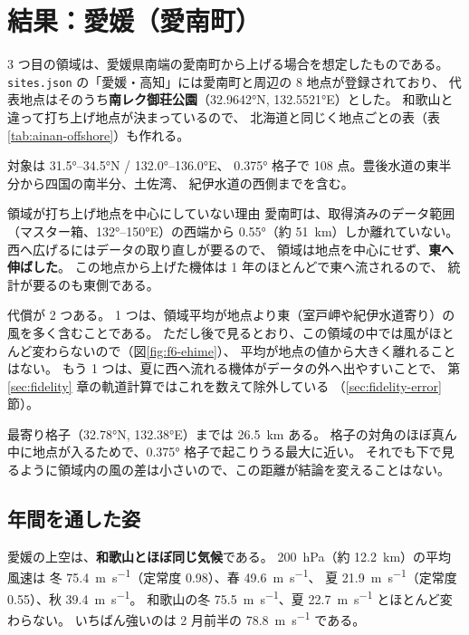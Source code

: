 \section{結果：愛媛（愛南町）}
\label{sec:ehime}

3 つ目の領域は、愛媛県南端の愛南町から上げる場合を想定したものである。
\texttt{sites.json} の「愛媛・高知」には愛南町と周辺の 8 地点が登録されており、
代表地点はそのうち\textbf{南レク御荘公園}（\ang{32.9642}N, \ang{132.5521}E）とした。
和歌山と違って打ち上げ地点が決まっているので、
北海道と同じく地点ごとの表（表\ref{tab:ainan-offshore}）も作れる。

対象は \ang{31.5}--\ang{34.5}N / \ang{132.0}--\ang{136.0}E、
\ang{0.375} 格子で 108 点。豊後水道の東半分から四国の南半分、土佐湾、
紀伊水道の西側までを含む。

\begin{whybox}{領域が打ち上げ地点を中心にしていない理由}
愛南町は、取得済みのデータ範囲（マスター箱、\ang{132}--\ang{150}E）の西端から
\ang{0.55}（約 \SI{51}{\kilo\metre}）しか離れていない。
西へ広げるにはデータの取り直しが要るので、
領域は地点を中心にせず、\textbf{東へ伸ばした}。
この地点から上げた機体は 1 年のほとんどで東へ流されるので、
統計が要るのも東側である。

代償が 2 つある。
1 つは、領域平均が地点より東（室戸岬や紀伊水道寄り）の風を多く含むことである。
ただし後で見るとおり、この領域の中では風がほとんど変わらないので（図\ref{fig:f6-ehime}）、
平均が地点の値から大きく離れることはない。
もう 1 つは、夏に西へ流れる機体がデータの外へ出やすいことで、
第 \ref{sec:fidelity} 章の軌道計算ではこれを数えて除外している
（\ref{sec:fidelity-error} 節）。
\end{whybox}

最寄り格子（\ang{32.78}N, \ang{132.38}E）までは \SI{26.5}{\kilo\metre} ある。
格子の対角のほぼ真ん中に地点が入るためで、\ang{0.375} 格子で起こりうる最大に近い。
それでも下で見るように領域内の風の差は小さいので、この距離が結論を変えることはない。

\subsection{年間を通した姿}





愛媛の上空は、\textbf{和歌山とほぼ同じ気候}である。
\SI{200}{\hecto\pascal}（約 \SI{12.2}{\kilo\metre}）の平均風速は
冬 \SI{75.4}{\metre\per\second}（定常度 0.98）、春 \SI{49.6}{\metre\per\second}、
夏 \SI{21.9}{\metre\per\second}（定常度 0.55）、秋 \SI{39.4}{\metre\per\second}。
和歌山の冬 \SI{75.5}{\metre\per\second}、夏 \SI{22.7}{\metre\per\second} とほとんど変わらない。
いちばん強いのは 2 月前半の \SI{78.8}{\metre\per\second} である。

